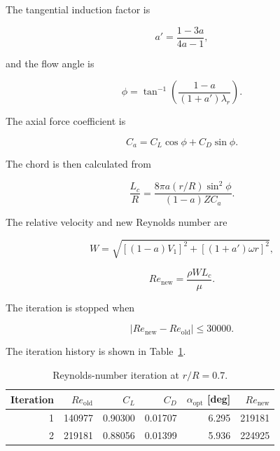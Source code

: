 \documentclass[11pt,a4paper]{article}
\begin{document}
The tangential induction factor is

\begin{equation}
a'=\frac{1-3a}{4a-1},
\end{equation}

and the flow angle is

\begin{equation}
\phi
=
\tan^{-1}
\left(
\frac{1-a}{(1+a')\lambda_r}
\right).
\end{equation}

The axial force coefficient is

\begin{equation}
C_a=C_L\cos\phi+C_D\sin\phi.
\end{equation}

The chord is then calculated from

\begin{equation}
\frac{L_c}{R}
=
\frac{
8\pi a(r/R)\sin^2\phi
}{
(1-a)ZC_a
}.
\end{equation}

The relative velocity and new Reynolds number are

\begin{equation}
W=
\sqrt{
[(1-a)V_1]^2+
[(1+a')\omega r]^2
},
\end{equation}

\begin{equation}
Re_{\mathrm{new}}
=
\frac{\rho W L_c}{\mu}.
\end{equation}

The iteration is stopped when

\begin{equation}
\left|Re_{\mathrm{new}}-Re_{\mathrm{old}}\right|
\leq30000.
\end{equation}

The iteration history is shown in Table~\ref{tab:iteration}.

\begin{table}[H]
\centering
\caption{Reynolds-number iteration at $r/R=0.7$.}
\label{tab:iteration}
\begin{tabular}{rrrrrr}
\toprule
Iteration & $Re_{\mathrm{old}}$ & $C_L$ & $C_D$ &
$\alpha_{\mathrm{opt}}$ [deg] & $Re_{\mathrm{new}}$ \\
\midrule
1 & 140977 & 0.90300 & 0.01707 & 6.295 & 219181 \\
2 & 219181 & 0.88056 & 0.01399 & 5.936 & 224925 \\
\bottomrule
\end{tabular}
\end{table}
\end{document}
